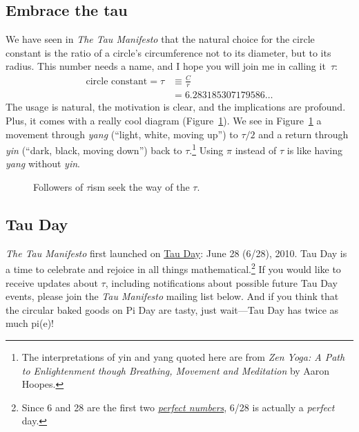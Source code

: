{  %

  \subsection{Embrace the tau} %
  \label{sec:embrace_the_tau}

We have seen in \emph{The Tau Manifesto} that the natural choice for the circle constant is the ratio of a circle's circumference not to its diameter, but to its radius. This number needs a name, and I hope you will join me in calling it~$\tau$:
\[
\begin{split}
\mbox{circle constant} = \tau & \equiv \frac{C}{r} \\
                              & = 6.283185307179586\ldots
\end{split}
\]
The usage is natural, the motivation is clear, and the implications are profound. Plus, it comes with a really cool diagram (Figure~\ref{fig:tauism}). We see in Figure~\ref{fig:tauism} a movement through \emph{yang} (``light, white, moving up'') to $\tau/2$ and a return through \emph{yin} (``dark, black, moving down'') back to $\tau$.\footnote{The interpretations of yin and yang quoted here are from \emph{Zen Yoga: A Path to Enlightenment though Breathing, Movement and Meditation} by Aaron Hoopes.} Using $\pi$ instead of $\tau$ is like having \emph{yang} without \emph{yin}.

\begin{figure}
\begin{center}
\end{center}
\caption{Followers of $\tau$ism seek the way of the $\tau$.\label{fig:tauism}}
\end{figure}



  \subsection{Tau Day} %
  \label{sec:tau_day}

\emph{The Tau Manifesto} first launched on \href{https://tauday.com/}{Tau Day}: June 28 (6/28), 2010. Tau Day is a time to celebrate and rejoice in all things mathematical.\footnote{Since 6 and 28 are the first two \href{https://en.wikipedia.org/wiki/Perfect_number}{\emph{perfect numbers}}, 6/28 is actually a \emph{perfect} day.} If you would like to receive updates about $\tau$, including notifications about possible future Tau Day events, please join the \emph{Tau Manifesto} mailing list below. And if you think that the circular baked goods on Pi Day are tasty, just wait---Tau Day has twice as much pi(e)!

}
